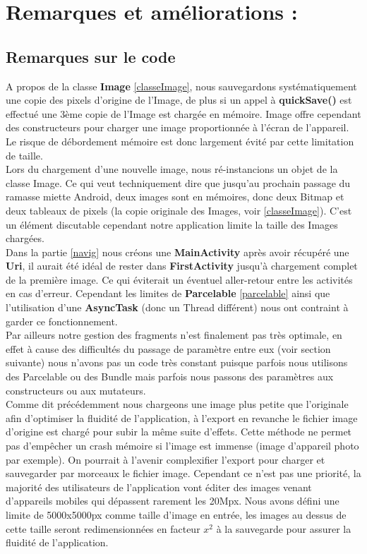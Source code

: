 \section{Remarques et améliorations  :}

\subsection{Remarques sur le code} \label{remarques_code}
A propos de la classe \textbf{Image} \ref{classeImage}, nous sauvegardons systématiquement une copie des pixels d'origine de l'Image, de plus si un appel à \textbf{quickSave()} est effectué une 3ème copie de l'Image est chargée en mémoire. Image offre cependant des constructeurs pour charger une image proportionnée à l'écran de l'appareil. Le risque de débordement mémoire est donc largement évité par cette limitation de taille.
\\

Lors du chargement d'une nouvelle image, nous ré-instancions un objet de la classe Image. Ce qui veut techniquement dire que jusqu'au prochain passage du ramasse miette Android, deux images sont en mémoires, donc deux Bitmap et deux tableaux de pixels (la copie originale des Images, voir \ref{classeImage}). C'est un élément discutable cependant notre application limite la taille des Images chargées.
\\

Dans la partie \ref{navig} nous créons une \textbf{MainActivity} après avoir récupéré une \textbf{Uri}, il aurait été idéal de rester dans \textbf{FirstActivity} jusqu'à chargement complet de la première image. Ce qui éviterait un éventuel aller-retour entre les activités en cas d'erreur. Cependant les limites de \textbf{Parcelable} \ref{parcelable} ainsi que l'utilisation d'une \textbf{AsyncTask} (donc un Thread différent) nous ont contraint à garder ce fonctionnement.
\\

Par ailleurs notre gestion des fragments n'est finalement pas très optimale, en effet à cause des difficultés du passage de paramètre entre eux (voir section suivante) nous n'avons pas un code très constant puisque parfois nous utilisons des Parcelable ou des Bundle mais parfois nous passons des paramètres aux constructeurs ou aux mutateurs.
\\

Comme dit précédemment nous chargeons une image plus petite que l'originale afin d'optimiser la fluidité de l'application, à l'export en revanche le fichier image d'origine est chargé pour subir la même suite d'effets. Cette méthode ne permet pas d'empêcher un crash mémoire si l'image est immense (image d'appareil photo par exemple). On pourrait à l'avenir complexifier l'export pour charger et sauvegarder par morceaux le fichier image. Cependant ce n'est pas une priorité, la majorité des utilisateurs de l'application vont éditer des images venant d'appareils mobiles qui dépassent rarement les 20Mpx.
Nous avons défini une limite de 5000x5000px comme taille d'image en entrée, les images au dessus de cette taille seront redimensionnées en facteur $x^2$ à la sauvegarde pour assurer la fluidité de l'application.
\\

